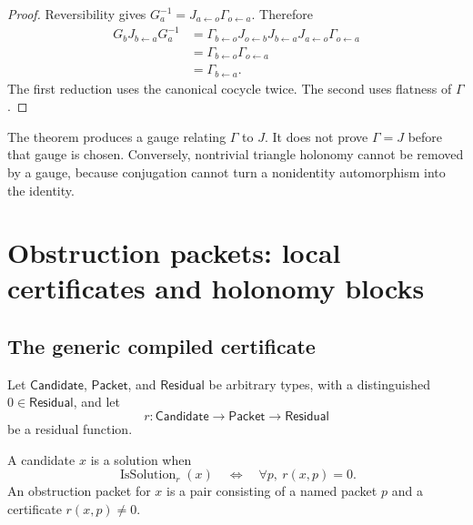 \begin{proof}
Reversibility gives
$G_a^{-1}=J_{a\leftarrow o}\Gamma_{o\leftarrow a}$.  Therefore
\[
\begin{aligned}
G_bJ_{b\leftarrow a}G_a^{-1}
&=
\Gamma_{b\leftarrow o}
J_{o\leftarrow b}J_{b\leftarrow a}
J_{a\leftarrow o}
\Gamma_{o\leftarrow a}\\
&=
\Gamma_{b\leftarrow o}\Gamma_{o\leftarrow a}\\
&=
\Gamma_{b\leftarrow a}.
\end{aligned}
\]
The first reduction uses the canonical cocycle twice. The second uses
flatness of $\Gamma$.
\end{proof}

\begin{boundary}
The theorem produces a gauge relating $\Gamma$ to $J$.  It does not prove
$\Gamma=J$ before that gauge is chosen.  Conversely, nontrivial triangle
holonomy cannot be removed by a gauge, because conjugation cannot turn a
nonidentity automorphism into the identity.
\end{boundary}

\section{Obstruction packets: local certificates and holonomy blocks}
\label{sec:obstruction-packets}

\subsection{The generic compiled certificate}

Let $\mathsf{Candidate}$, $\mathsf{Packet}$, and $\mathsf{Residual}$ be
arbitrary types, with a distinguished
$0\in\mathsf{Residual}$, and let
\[
r:\mathsf{Candidate}\longrightarrow
\mathsf{Packet}\longrightarrow\mathsf{Residual}
\]
be a residual function.

\begin{definition}
\label{def:generic-obstruction}
A candidate $x$ is a solution when
\[
\operatorname{IsSolution}_r(x)
\quad\Longleftrightarrow\quad
\forall p,\ r(x,p)=0.
\]
An obstruction packet for $x$ is a pair consisting of a named packet $p$
and a certificate $r(x,p)\ne0$.
\end{definition}

